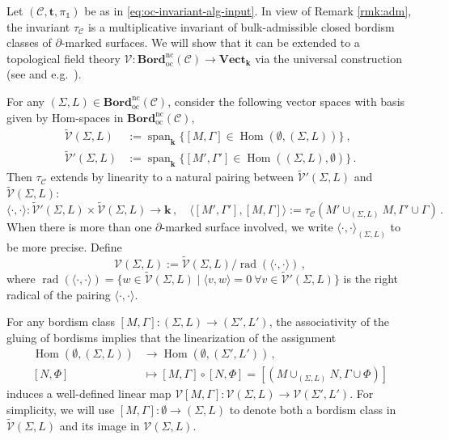 \documentclass[11pt]{amsart}
\theoremstyle{definition}
\numberwithin{equation}{section}
\def\bd{{\partial}}
\def\mtr{{\mathbf{t}}} %
\def\ourBord{\mathbf{Bord}^{\operatorname{nc}}_{\operatorname{oc}}}
\def\span{\operatorname{span}}
\newcommand{\pair}[1]{\langle #1 \rangle}
\def\ourV{\cV}
\def\tbv{\widetilde{\ourV}}
\def\cC{\mathcal{C}}
\def\cV{\mathcal{V}}
\def\kk{{\bm{k}}}
\def\1{{\mathds{1}}}
\def\to{\rightarrow}
\def\Hom{{\operatorname{Hom}}}
\def\Rad{{\operatorname{rad}}}
\def\rad{\Rad}
\def\Vect{{\mathbf{Vect}}}
\begin{document}
Let $(\cC, \mtr, \pi_\1)$ be as in \eqref{eq:oc-invariant-alg-input}.
In view of Remark \ref{rmk:adm}, the invariant $\tau_\cC$ is a multiplicative invariant of bulk-admissible closed bordism classes of $\bd$-marked surfaces. We will show that it can be extended to a topological field theory $\ourV: \ourBord(\cC) \to \Vect_{\kk}$ via the universal construction (see \cite{BHMV2} and e.g.\ \cite[Ch.\,7.7]{Geer-Patureau-book}). 


For any $(\Sigma, L) \in \ourBord(\cC)$, consider the following vector spaces with basis given by Hom-spaces in $\ourBord(\cC)$,
\begin{equation}
\begin{split}
    \tbv(\Sigma, L) &:= \span_{\kk}\{[M,\Gamma] \in \Hom(\emptyset, (\Sigma, L))\} \ ,
    \\
\tbv'(\Sigma,L) &:= \span_{\kk}\{[M',\Gamma'] \in \Hom((\Sigma, L), \emptyset)\}\,.
\end{split}
\end{equation}
Then $\tau_{\cC}$ extends by linearity to a natural pairing between $\tbv'(\Sigma, L)$ and $\tbv(\Sigma,L)$:
\begin{equation}
\pair{\cdot, \cdot}: \tbv'(\Sigma, L) \times \tbv(\Sigma,L) \to \kk\,, \quad \pair{[M',\Gamma'], [M, \Gamma]} := \tau_{\cC}(M'\cup_{(\Sigma, L)} M, \Gamma' \cup \Gamma)\,.
\end{equation}
When there is more than one $\bd$-marked surface involved, we write $\pair{\cdot, \cdot}_{(\Sigma, L)}$ to be more precise.
Define
\begin{equation}\label{eq:V-on-obj}
\ourV(\Sigma,L) := \tbv(\Sigma, L)/\rad(\pair{\cdot, \cdot})\,,
\end{equation}
where $\rad(\pair{\cdot, \cdot}) = \{w \in \tbv(\Sigma, L)\mid \pair{v,w}=0\ \forall v \in \tbv'(\Sigma,L)\}$ is the right radical of the pairing $\pair{\cdot, \cdot}$. 

For any bordism class $[M,\Gamma]: (\Sigma, L)\to (\Sigma',L')$, the associativity of the gluing of bordisms implies that the linearization of the assignment 
\begin{equation}\label{eq:V-on-bordism}
\begin{split}
\Hom(\emptyset, (\Sigma,L)) &\to \Hom(\emptyset, (\Sigma',L'))\,,\\
[N,\Phi] &\mapsto [M,\Gamma]\circ[N,\Phi] = [(M \cup_{(\Sigma,L)} N, \Gamma \cup \Phi)]
\end{split}\end{equation}
induces a well-defined linear map $\ourV[M,\Gamma]: \ourV(\Sigma,L) \to \ourV(\Sigma',L')$. For simplicity, we will use $[M,\Gamma]: \emptyset \to (\Sigma, L)$ to denote both a bordism class in $\tbv(\Sigma, L)$ and its image in $\ourV(\Sigma, L)$. 
\end{document}
